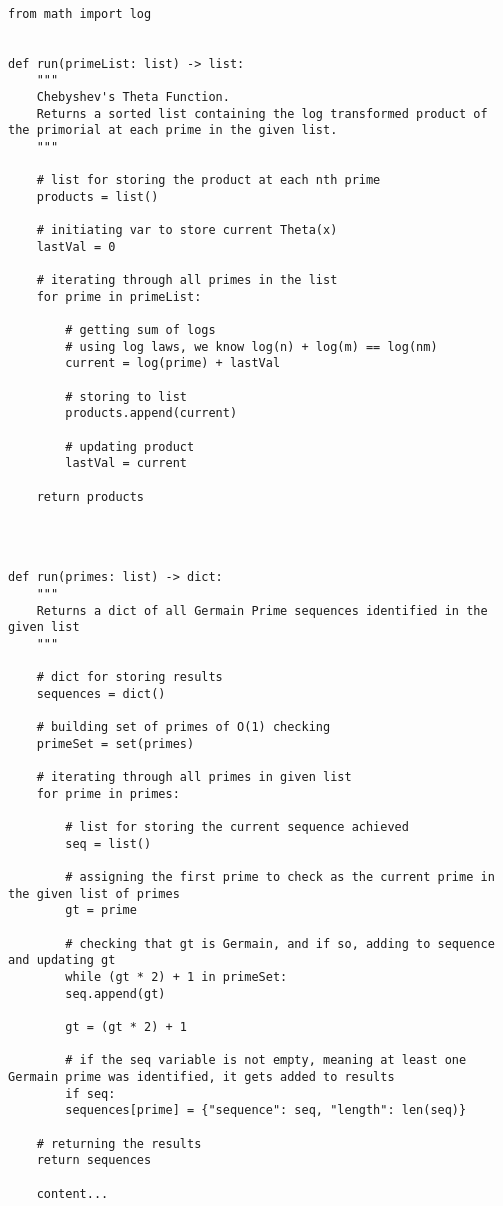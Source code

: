 \documentclass[11pt]{article}
\begin{document}
\begin{lstlisting}

from math import log


def run(primeList: list) -> list:
	"""
	Chebyshev's Theta Function.
	Returns a sorted list containing the log transformed product of the primorial at each prime in the given list.
	"""

	# list for storing the product at each nth prime
	products = list()

	# initiating var to store current Theta(x)
	lastVal = 0

	# iterating through all primes in the list
	for prime in primeList:

		# getting sum of logs
		# using log laws, we know log(n) + log(m) == log(nm)
		current = log(prime) + lastVal
		
		# storing to list
		products.append(current)
		
		# updating product
		lastVal = current

	return products



\end{lstlisting}

\newpage

\lstset{style = GermainSequence}

\begin{lstlisting}

def run(primes: list) -> dict:
	"""
	Returns a dict of all Germain Prime sequences identified in the given list
	"""

	# dict for storing results
	sequences = dict()
	
	# building set of primes of O(1) checking
	primeSet = set(primes)
	
	# iterating through all primes in given list
	for prime in primes:

		# list for storing the current sequence achieved
		seq = list()
		
		# assigning the first prime to check as the current prime in the given list of primes
		gt = prime
		
		# checking that gt is Germain, and if so, adding to sequence and updating gt
		while (gt * 2) + 1 in primeSet:
		seq.append(gt)
		
		gt = (gt * 2) + 1
		
		# if the seq variable is not empty, meaning at least one Germain prime was identified, it gets added to results
		if seq:
		sequences[prime] = {"sequence": seq, "length": len(seq)}

	# returning the results
	return sequences

	content...
\end{lstlisting}
\end{document}
